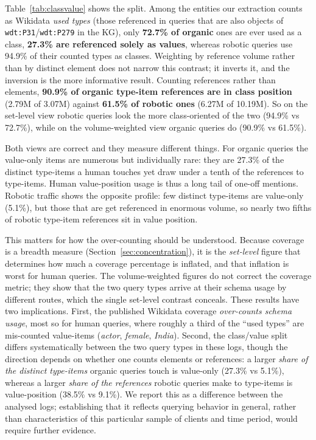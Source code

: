\documentclass[sw]{iosart2x}
\begin{document}
Table~\ref{tab:classvalue} shows the split. Among the entities our extraction counts as Wikidata \emph{used types} (those referenced in queries that are also objects of \texttt{wdt:P31}/\texttt{wdt:P279} in the KG), only \textbf{72.7\% of organic} ones are ever used as a class, \textbf{27.3\% are referenced solely as values}, whereas robotic queries use 94.9\% of their counted types as classes. Weighting by reference volume rather than by distinct element does not narrow this contrast; it inverts it, and the inversion is the more informative result. Counting references rather than elements, \textbf{90.9\% of organic type-item references are in class position} (2.79M of 3.07M) against \textbf{61.5\% of robotic ones} (6.27M of 10.19M). So on the set-level view robotic queries look the more class-oriented of the two (94.9\% vs 72.7\%), while on the volume-weighted view organic queries do (90.9\% vs 61.5\%).

Both views are correct and they measure different things. For organic queries the value-only items are numerous but individually rare: they are 27.3\% of the distinct type-items a human touches yet draw under a tenth of the references to type-items. Human value-position usage is thus a long tail of one-off mentions. Robotic traffic shows the opposite profile: few distinct type-items are value-only (5.1\%), but those that are get referenced in enormous volume, so nearly two fifths of robotic type-item references sit in value position.

This matters for how the over-counting should be understood. Because coverage is a breadth measure (Section~\ref{sec:concentration}), it is the \emph{set-level} figure that determines how much a coverage percentage is inflated, and that inflation is worst for human queries. The volume-weighted figures do not correct the coverage metric; they show that the two query types arrive at their schema usage by different routes, which the single set-level contrast conceals. These results have two implications. First, the published Wikidata coverage \emph{over-counts schema usage}, most so for human queries, where roughly a third of the ``used types'' are mis-counted value-items (\emph{actor}, \emph{female}, \emph{India}). Second, the class/value split differs systematically between the two query types in these logs, though the direction depends on whether one counts elements or references: a larger \emph{share of the distinct type-items} organic queries touch is value-only (27.3\% vs 5.1\%), whereas a larger \emph{share of the references} robotic queries make to type-items is value-position (38.5\% vs 9.1\%). We report this as a difference between the analysed logs; establishing that it reflects querying behavior in general, rather than characteristics of this particular sample of clients and time period, would require further evidence.
\end{document}
